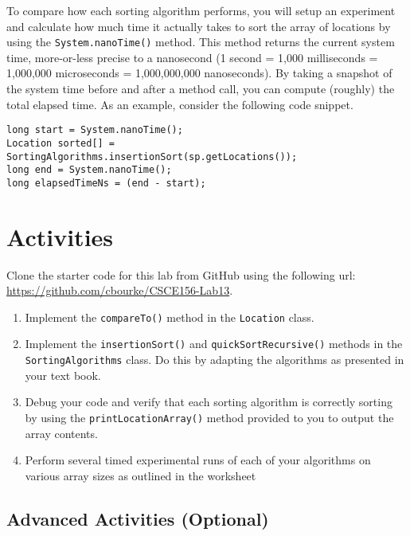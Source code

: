 \documentclass[12pt]{scrartcl}
\begin{document}
To compare how each sorting algorithm performs, you will setup an 
experiment and calculate how much time it actually takes to sort the 
array of locations by using the \texttt{System.nanoTime()} 
method.  This method returns the current system time, more-or-less 
precise to a nanosecond (1 second = 1,000 milliseconds = 1,000,000 
microseconds = 1,000,000,000 nanoseconds).  By taking a snapshot of 
the system time before and after a method call, you can compute 
(roughly) the total elapsed time.  As an example, consider the 
following code snippet.

\begin{verbatim}
long start = System.nanoTime();
Location sorted[] = SortingAlgorithms.insertionSort(sp.getLocations());
long end = System.nanoTime();
long elapsedTimeNs = (end - start);
\end{verbatim}

\section*{Activities}

Clone the starter code for this lab from GitHub using the following
url: \url{https://github.com/cbourke/CSCE156-Lab13}.

\begin{enumerate}
  \item Implement the \texttt{compareTo()} method in the 
    \texttt{Location} class.
  \item Implement the \texttt{insertionSort()} and 
    \texttt{quickSortRecursive()} methods in the 
    \texttt{SortingAlgorithms} class.  Do this by adapting 
    the algorithms as presented in your text book.
  \item Debug your code and verify that each sorting algorithm is 
    correctly sorting by using the \texttt{printLocationArray()} 
    method provided to you to output the array contents. 
  \item Perform several timed experimental runs of each of your 
    algorithms on various array sizes as outlined in the worksheet
\end{enumerate}

\subsection*{Advanced Activities (Optional)}
\end{document}
